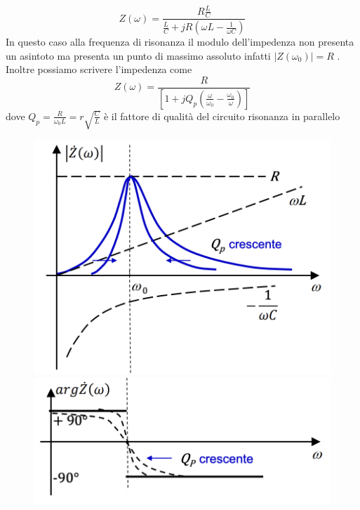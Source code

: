\documentclass{article}
\theoremstyle{definition}
\begin{document}
\begin{itemize}
\begin{center}
\end{center}
$$Z(\omega)=\frac{R\frac{L}{C}}{\frac{L}{C}+jR\left(\omega L -\frac{1}{\omega C} \right) }$$
In questo caso alla frequenza di risonanza il modulo dell'impedenza non presenta un asintoto ma presenta un punto di massimo assoluto infatti $|Z(\omega_0)|=R$ .\\
Inoltre possiamo scrivere l'impedenza come 
$$Z(\omega)=\frac{R}{\left[ 1+jQ_p\left( \frac{\omega}{\omega_0}-\frac{\omega_0}{\omega}\right) \right]}$$
dove $Q_p=\frac{R}{\omega_0 L}=r\sqrt{\frac{C}{L}}$ è il fattore di qualità del circuito risonanza in parallelo 
\begin{figure}[h]
	\centering
	\includegraphics[scale=0.25]{immagini/7}
	\hfil
	\includegraphics[scale=0.25]{immagini/8}
\end{figure}

\end{itemize}
\end{document}
